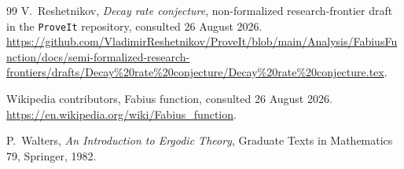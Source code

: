 \documentclass[11pt,oneside]{article}
\theoremstyle{definition}
\theoremstyle{remark}
\begin{document}
\begin{thebibliography}{99}
V.~Reshetnikov,
\newblock \emph{Decay rate conjecture},
\newblock non-formalized research-frontier draft in the \texttt{ProveIt}
repository, consulted 26 August 2026.
\newblock \url{https://github.com/VladimirReshetnikov/ProveIt/blob/main/Analysis/FabiusFunction/docs/semi-formalized-research-frontiers/drafts/Decay%20rate%20conjecture/Decay%20rate%20conjecture.tex}.

Wikipedia contributors,
\newblock Fabius function,
\newblock consulted 26 August 2026.
\newblock \url{https://en.wikipedia.org/wiki/Fabius_function}.

P.~Walters,
\newblock \emph{An Introduction to Ergodic Theory},
\newblock Graduate Texts in Mathematics 79, Springer, 1982.

\end{thebibliography}
\end{document}
